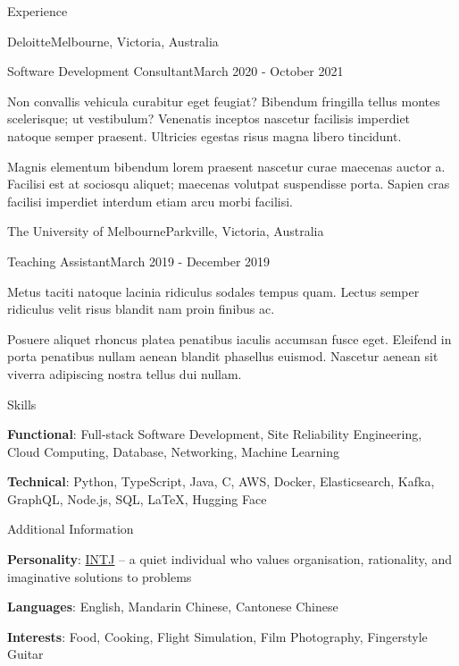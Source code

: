 \documentclass{xsha}
\begin{document}
\begin{xsection}{Experience}
\begin{xheading}{Deloitte}{Melbourne, Victoria, Australia}
\begin{xsubheading}{Software Development Consultant}{March 2020 - October 2021}
\item Non convallis vehicula curabitur eget feugiat? Bibendum fringilla tellus montes scelerisque; ut vestibulum? Venenatis inceptos nascetur facilisis imperdiet natoque semper praesent. Ultricies egestas risus magna libero tincidunt.
\item Magnis elementum bibendum lorem praesent nascetur curae maecenas auctor a. Facilisi est at sociosqu aliquet; maecenas volutpat suspendisse porta. Sapien cras facilisi imperdiet interdum etiam arcu morbi facilisi.
\end{xsubheading}
\end{xheading}

\begin{xheading}{The University of Melbourne}{Parkville, Victoria, Australia}
\begin{xsubheading}{Teaching Assistant}{March 2019 - December 2019}
\item Metus taciti natoque lacinia ridiculus sodales tempus quam. Lectus semper ridiculus velit risus blandit nam proin finibus ac.
\item Posuere aliquet rhoncus platea penatibus iaculis accumsan fusce eget. Eleifend in porta penatibus nullam aenean blandit phasellus euismod. Nascetur aenean sit viverra adipiscing nostra tellus dui nullam.
\end{xsubheading}
\end{xheading}

\end{xsection}

\begin{xsection}{Skills}
\item \textbf{Functional}: Full-stack Software Development, Site Reliability Engineering, Cloud Computing, Database, Networking, Machine Learning
\item \textbf{Technical}: Python, TypeScript, Java, C, AWS, Docker, Elasticsearch, Kafka, GraphQL, Node.js, SQL, \LaTeX, Hugging Face
\end{xsection}

\begin{xsection}{Additional Information}
\item \textbf{Personality}: \href{https://www.16personalities.com/intj-personality}{INTJ} -- a quiet individual who values organisation, rationality, and imaginative solutions to problems
\item \textbf{Languages}: English, Mandarin Chinese, Cantonese Chinese
\item \textbf{Interests}: Food, Cooking, Flight Simulation, Film Photography, Fingerstyle Guitar
\end{xsection}
\end{document}
